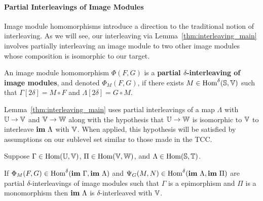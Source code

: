 \paragraph*{Partial Interleavings of Image Modules}

Image module homomorphisms introduce a direction to the traditional notion of interleaving.
As we will see, our interleaving via Lemma~\ref{thm:interleaving_main} involves partially interleaving an image module to two other image modules whose composition is isomorphic to our target.

\begin{definition}
  An image module homomorphism $\Phi(F, G)$ is a \textbf{partial $\delta$-interleaving of image modules}, and denoted $\Phi_M(F, G)$, if there exists $M\in\mathrm{Hom}^\delta(\mathbb{S},\mathbb{V})$ such that $\Gamma[2\delta] = M\circ F$ and $\Lambda[2\delta] = G\circ M$.
\end{definition}



Lemma~\ref{thm:interleaving_main} uses partial interleavings of a map $\Lambda$ with $\mathbb{U}\to\mathbb{V}$ and $\mathbb{V}\to\mathbb{W}$ along with the hypothesis that $\mathbb{U}\to \mathbb{W}$ is isomorphic to $\mathbb{V}$ to interleave $\mathbf{im}~\Lambda$ with $\mathbb{V}$.
When applied, this hypothesis will be satisfied by assumptions on our sublevel set similar to those made in the TCC.

\begin{lemma}\label{thm:interleaving_main}
  Suppose $\Gamma\in\mathrm{Hom}(\mathbb{U},\mathbb{V})$, $\Pi\in\mathrm{Hom}(\mathbb{V},\mathbb{W})$, and $\Lambda\in\mathrm{Hom}(\mathbb{S}, \mathbb{T})$.

  If $\Phi_M(F, G)\in\mathrm{Hom}^\delta(\mathbf{im}~\Gamma, \mathbf{im}~\Lambda)$ and $\Psi_G(M, N)\in\mathrm{Hom}^\delta(\mathbf{im}~\Lambda, \mathbf{im}~\Pi)$ are partial $\delta$-interleavings of image modules such that $\Gamma$ is a epimorphism and $\Pi$ is a monomorphism then $\mathbf{im}~\Lambda$ is $\delta$-interleaved with $\mathbb{V}$.
\end{lemma}
